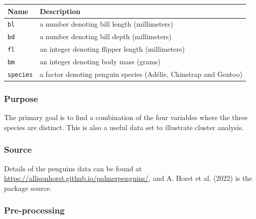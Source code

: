 \documentclass[
  letterpaper,
]{krantz}
\newcounter{none} %
\begin{document}
{\def\LTcaptype{none} %
\begin{longtable}[]{@{}
  >{\raggedright\arraybackslash}p{}
  >{\raggedright\arraybackslash}p{}@{}}
\toprule\noalign{}
\begin{minipage}[b]{\linewidth}\raggedright
Name
\end{minipage} & \begin{minipage}[b]{\linewidth}\raggedright
Description
\end{minipage} \\
\midrule\noalign{}
\endhead
\bottomrule\noalign{}
\endlastfoot
\texttt{bl} & a number denoting bill length (millimeters) \\
\texttt{bd} & a number denoting bill depth (millimeters) \\
\texttt{fl} & an integer denoting flipper length (millimeters) \\
\texttt{bm} & an integer denoting body mass (grams) \\
\texttt{species} & a factor denoting penguin species (Adélie, Chinstrap
and Gentoo) \\
\end{longtable}
}

\subsubsection*{Purpose}\label{purpose-3}

The primary goal is to find a combination of the four variables where
the three species are distinct. This is also a useful data set to
illustrate cluster analysis.

\subsubsection*{Source}\label{source-3}

Details of the penguins data can be found at
\url{https://allisonhorst.github.io/palmerpenguins/}, and A. Horst et
al. (2022) is the package source.

\subsubsection*{Pre-processing}\label{pre-processing-3}
\end{document}
